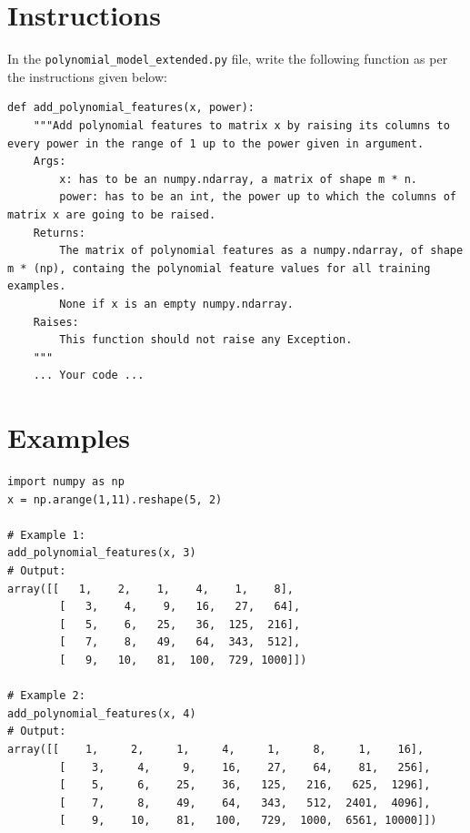 \documentclass{42-en}
\begin{document}
\section*{Instructions}
In the \texttt{polynomial\_model\_extended.py} file, write the following function as per the instructions given below:

\begin{verbatim}
def add_polynomial_features(x, power):
	"""Add polynomial features to matrix x by raising its columns to every power in the range of 1 up to the power given in argument.  
	Args:
		x: has to be an numpy.ndarray, a matrix of shape m * n.
		power: has to be an int, the power up to which the columns of matrix x are going to be raised.
	Returns:
		The matrix of polynomial features as a numpy.ndarray, of shape m * (np), containg the polynomial feature values for all training examples.
		None if x is an empty numpy.ndarray.
	Raises:
		This function should not raise any Exception.
	"""
	... Your code ...
\end{verbatim}


\section*{Examples}

\begin{verbatim}
import numpy as np
x = np.arange(1,11).reshape(5, 2)

# Example 1:
add_polynomial_features(x, 3)
# Output:
array([[   1,    2,    1,    4,    1,    8],
		[   3,    4,    9,   16,   27,   64],
		[   5,    6,   25,   36,  125,  216],
		[   7,    8,   49,   64,  343,  512],
		[   9,   10,   81,  100,  729, 1000]])

# Example 2:
add_polynomial_features(x, 4)
# Output:
array([[    1,     2,     1,     4,     1,     8,     1,    16],
		[    3,     4,     9,    16,    27,    64,    81,   256],
		[    5,     6,    25,    36,   125,   216,   625,  1296],
		[    7,     8,    49,    64,   343,   512,  2401,  4096],
		[    9,    10,    81,   100,   729,  1000,  6561, 10000]])
\end{verbatim}

\end{document}
